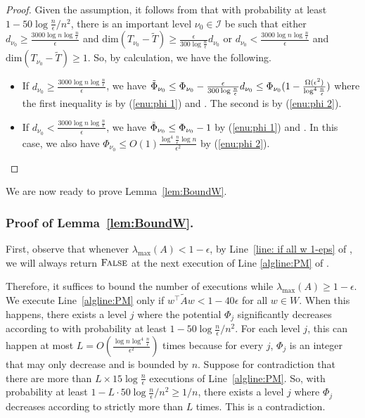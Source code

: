 \documentclass[11pt]{article}
\def\dimm{\mathrm{dim}}
\newcommand\ww{\boldsymbol{\mathit{w}}}
\renewcommand\AA{\boldsymbol{\mathit{A}}}
\newcommand\WW{\boldsymbol{\mathit{W}}}
\newcommand\AAtil{\boldsymbol{\widetilde{\mathit{A}}}}
\begin{document}
\begin{proof}
	Given the assumption, it follows from  that with probability at least $1-50\log\frac{n}{\epsilon}/n^{2}$, there is an important level $\nu_{0}\in\mathcal{I}$ be such that either $d_{\nu_{0}}\geq\frac{3000\log n\log\frac{n}{\epsilon}}{\epsilon}$ and $\dimm(T_{\nu_{0}}-\tilde{T})\geq\frac{\epsilon}{300\log\frac{n}{\epsilon}}d_{\nu_{0}}$ or $d_{\nu_{0}}<\frac{3000\log n\log\frac{n}{\epsilon}}{\epsilon}$ and $\dimm(T_{\nu_{0}}-\tilde{T})\geq1$. So, by calculation, we have the following.
	\begin{itemize}
		\item If $d_{\nu_{0}}\geq\frac{3000\log n\log\frac{n}{\epsilon}}{\epsilon}$, we have $\tilde{\Phi}_{\nu_{0}}\leq\Phi_{\nu_{0}}-\frac{\epsilon}{300\log\frac{n}{\epsilon}}d_{\nu_{0}}\le\Phi_{\nu_{0}}(1-\frac{\Omega(\epsilon^{2})}{\log^{4}\frac{n}{\epsilon}})$ where the first inequality is by (\ref{enu:phi 1}) and . The second is by (\ref{enu:phi 2}). 
		\item If $d_{\nu_{0}}<\frac{3000\log n\log\frac{n}{\epsilon}}{\epsilon}$, we have $\tilde{\Phi}_{\nu_{0}}\le\Phi_{\nu_{0}}-1$ by (\ref{enu:phi 1}) and . In this case, we also have $\Phi_{\nu_{0}}\leq O(1)\frac{\log^{4}\frac{n}{\epsilon}\log n}{\epsilon^{2}}$ by (\ref{enu:phi 2}). 
	\end{itemize}
\end{proof}
We are now ready to prove Lemma~\ref{lem:BoundW}. 

\subsubsection*{Proof of Lemma~\ref{lem:BoundW}.}

First, observe that whenever $\lambda_{\max}(\AA)<1-\epsilon$, by Line~\ref{line: if all w 1-eps} of , we will always return $\textsc{False}$ at the next execution of Line \ref{algline:PM} of .

Therefore, it suffices to bound the number of executions while $\lambda_{\max}(\AA)\ge1-\epsilon$. We execute Line~\ref{algline:PM} only if $\ww^{\top}\AAtil\ww<1-40\epsilon$ for all $\ww\in\WW$. When this happens, there exists a level $j$ where the potential $\Phi_{j}$ significantly decreases according to  with probability at least $1-50\log\frac{n}{\epsilon}/n^{2}$. For each level $j$, this can happen at most $L=O(\frac{\log n\log^{4}\frac{n}{\epsilon}}{\epsilon^{2}})$ times because for every $j$, $\Phi_{j}$ is an integer that may only decrease and is bounded by $n$. Suppose for contradiction that there are more than $L\times15\log\frac{n}{\epsilon}$ executions of Line~\ref{algline:PM}. So, with probability at least $1-L\cdot50\log\frac{n}{\epsilon}/n^{2}\ge1/n$, there exists a level $j$ where $\Phi_{j}$ decreases according to  strictly more than $L$ times. This is a contradiction. 
\end{document}
